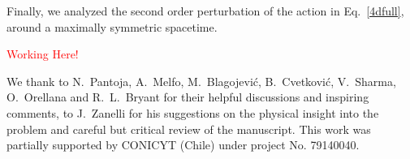 \documentclass[aps,prd,12pt,twocolumn,superscriptaddress,showpacs,showkeys,reprint%
]{revtex4-1}
\renewcommand{\(}{\left(}
\renewcommand{\)}{\right)}
\renewcommand{\[}{\left[}
\renewcommand{\]}{\right]}
\begin{document}
Finally, we analyzed the second order perturbation of the action in Eq.~\eqref{4dfull}, around a maximally symmetric spacetime.

{\huge{\textcolor{red}{Working Here!}}}


\begin{acknowledgments}
  We thank to N.~Pantoja, A.~Melfo, M.~Blagojevi\'c, B.~Cvetkovi\'c, V.~Sharma, O.~Orellana and R.~L.~Bryant for their helpful discussions and inspiring comments, to J.~Zanelli for his suggestions on the physical insight into the problem and careful but critical review of the manuscript.
  This work was partially supported by CONICYT (Chile) under project No. 79140040.
\end{acknowledgments}

\appendix





\end{document}

